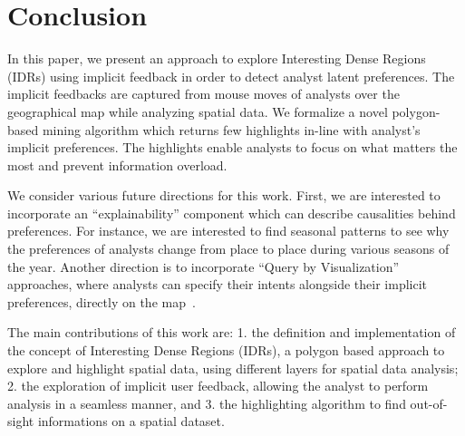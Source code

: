 \documentclass[sigconf,edbt]{acmart-edbt2019}
\begin{document}
\section{Conclusion}
\label{sec:conclusion}

In this paper, we present an approach to explore Interesting Dense Regions (IDRs) using implicit feedback in order to detect analyst latent preferences. The implicit feedbacks are captured from mouse moves of analysts over the geographical map while analyzing spatial data. We formalize a novel polygon-based mining algorithm which returns few highlights in-line with analyst's implicit preferences. The highlights enable analysts to focus on what matters the most and prevent information overload.

\vspace{2pt}
We consider various future directions for this work. First, we are interested to incorporate an ``explainability'' component which can describe causalities behind preferences. For instance, we are interested to find seasonal patterns to see why the preferences of analysts change from place to place during various seasons of the year. Another direction is to incorporate ``Query by Visualization'' approaches, where analysts can specify their intents alongside their implicit preferences, directly on the map~\cite{siddiqui2016effortless}.

The main contributions of this work are: 1. the definition and implementation of the concept of Interesting Dense Regions (IDRs), a polygon based approach to explore and highlight spatial data, using different layers for spatial data analysis; 2. the exploration of implicit user feedback, allowing the analyst to perform analysis in a seamless manner, and 3. the highlighting algorithm to find out-of-sight informations on a spatial dataset. 


 
\end{document}
